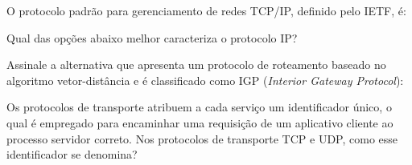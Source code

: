 \documentclass[10pt,a4paper]{article}
\begin{document}
{
\def\AMCbeginQuestion#1#2{\par\noindent{\bf (POSCOMP 2004 - Questão 68)}}
\begin{question}{} O protocolo padrão para gerenciamento de redes TCP/IP, definido pelo IETF, é:
\begin{choices}
\end{choices}
\end{question}
}
%
{
\def\AMCbeginQuestion#1#2{\par\noindent{\bf (POSCOMP 2004 - Questão 69)}}
\begin{question}{} Qual das opções abaixo melhor caracteriza o protocolo IP?
\begin{choices}
\end{choices}
\end{question}
}
%
{
\def\AMCbeginQuestion#1#2{\par\noindent{\bf (POSCOMP 2004 - Questão 70)}}
\begin{question}{} Assinale a alternativa que apresenta um protocolo de roteamento baseado no algoritmo vetor-distância e é classificado como IGP (\textit{Interior Gateway Protocol}):
\begin{choices}
\end{choices}
\end{question}
}
%
{
\def\AMCbeginQuestion#1#2{\par\noindent{\bf (POSCOMP 2005 - Questão 63)}}
\begin{question}{} Os protocolos de transporte atribuem a cada serviço um identificador único, o qual é empregado para encaminhar uma requisição de um aplicativo cliente ao processo servidor correto. Nos protocolos de transporte TCP e UDP, como esse identificador se denomina?
\begin{choices}
\end{choices}
\end{question}
}
\end{document}
